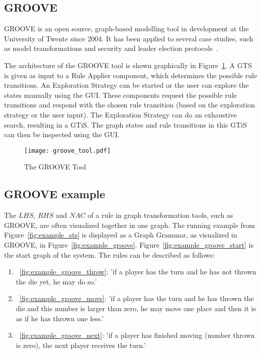 \subsection{GROOVE}\label{sec:descriptiongroove}
GROOVE is an open source, graph-based modelling tool in development at the University of Twente since 2004. It has been applied to several case studies, such as model transformations and security and leader election protocols~\cite{Ghamarian:GROOVE}.

The architecture of the GROOVE tool is shown graphically in Figure~\ref{fig:groove_tool}. A GTS is given as input to a Rule Applier component, which determines the possible rule transitions. An Exploration Strategy can be started or the user can explore the states manually using the GUI. These components request the possible rule transitions and respond with the chosen rule transition (based on the exploration strategy or the user input). The Exploration Strategy can do an exhaustive search, resulting in a GTiS. The graph states and rule transitions in this GTiS can then be inspected using the GUI.

\begin{figure}[h]
  \begin{center}
    \texttt{[image: groove\_tool.pdf]}
  \end{center}
  \caption{The GROOVE Tool}
  \label{fig:groove_tool}
\end{figure}

\subsection{GROOVE example}
The $\mathit{LHS}$, $\mathit{RHS}$ and $\mathit{NAC}$ of a rule in graph transformation tools, such as GROOVE, are often visualized together in one graph. The running example from Figure~\ref{fig:example_sts} is displayed as a Graph Grammar, as visualized in GROOVE, in Figure~\ref{fig:example_groove}. Figure~\ref{fig:example_groove_start} is the start graph of the system. The rules can be described as follows:
\begin{enumerate}
  \item~\ref{fig:example_groove_throw}: 'if a player has the turn and he has not thrown the die yet, he may do so.'
  \item~\ref{fig:example_groove_move}: 'if a player has the turn and he has thrown the die and this number is larger than zero, he may move one place and then it is as if he has thrown one less.'
  \item~\ref{fig:example_groove_next}: 'if a player has finished moving (number thrown is zero), the next player receives the turn.'
\end{enumerate}


